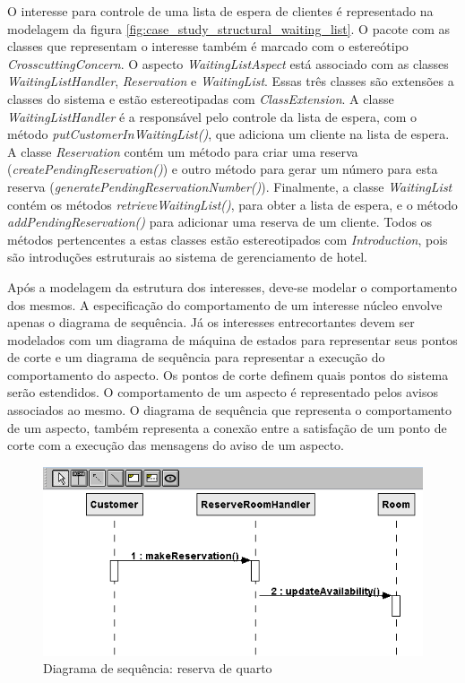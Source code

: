 O interesse para controle de uma lista de espera de clientes é representado na modelagem da figura \ref{fig:case_study_structural_waiting_list}. O
pacote com as classes que representam o interesse também é marcado com o estereótipo \textit{CrosscuttingConcern}. O aspecto \textit{WaitingListAspect} está
associado com as classes \textit{WaitingListHandler}, \textit{Reservation} e \textit{WaitingList}. Essas três classes são extensões a classes do
sistema e estão estereotipadas com \textit{ClassExtension}. A classe \textit{WaitingListHandler} é a responsável pelo controle da lista de espera, com
o método \textit{putCustomerInWaitingList()}, que adiciona um cliente na lista de espera. A classe \textit{Reservation} contém um método para criar
uma reserva (\textit{createPendingReservation()}) e outro método para gerar um número para esta reserva (\textit{generatePendingReservationNumber()}).
Finalmente, a classe \textit{WaitingList} contém os métodos \textit{retrieveWaitingList()}, para obter a lista de espera, e o método
\textit{addPendingReservation()} para adicionar uma reserva de um cliente. Todos os métodos pertencentes a estas classes estão estereotipados com
\textit{Introduction}, pois são introduções estruturais ao sistema de gerenciamento de hotel.

Após a modelagem da estrutura dos interesses, deve-se modelar o comportamento dos mesmos. A especificação do comportamento de um interesse núcleo
envolve apenas o diagrama de sequência. Já os interesses entrecortantes devem ser modelados com um diagrama de máquina de estados para representar
seus pontos de corte e um diagrama de sequência para representar a execução do comportamento do aspecto. Os pontos de corte definem quais pontos do
sistema serão estendidos. O comportamento de um aspecto é representado pelos avisos associados ao mesmo. O diagrama de sequência que representa o
comportamento de um aspecto, também representa a conexão entre a satisfação de um ponto de corte com a execução das mensagens do aviso de um aspecto.

  \begin{figure}[!h]
	\centering
	\includegraphics{img/case_study_behavioral_reserve_room.png}
	\caption{Diagrama de sequência: reserva de quarto}\label{fig:case_study_behavioral_reserve_room}
  \end{figure}

